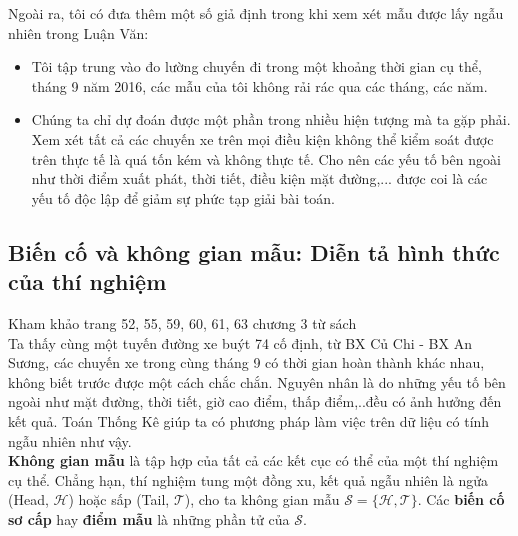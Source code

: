 \documentclass[a4paper, 13pt]{report}
\begin{document}
Ngoài ra, tôi có đưa thêm một số giả định trong khi xem xét mẫu được lấy ngẫu nhiên trong Luận Văn: 
\begin{itemize}
\item Tôi tập trung vào đo lường chuyến đi trong một khoảng thời gian cụ thể, tháng 9 năm 2016, các mẫu của tôi không rải rác qua các tháng, các năm. 
\item  Chúng ta chỉ dự đoán được một phần trong nhiều hiện tượng mà ta gặp phải. Xem xét tất cả các chuyến xe trên mọi điều kiện không thể kiểm soát được trên thực tế là quá tốn kém và không thực tế. Cho nên các yếu tố bên ngoài như thời điểm xuất phát, thời tiết, điều kiện mặt đường,... được coi là các yếu tố độc lập để giảm sự phức tạp giải bài toán.
\end{itemize}  
\subsection*{Biến cố và không gian mẫu: Diễn tả hình thức của thí nghiệm}
Kham khảo trang 52, 55, 59, 60, 61, 63 chương 3 từ sách \cite{TKCNUDR}\\
Ta thấy cùng một tuyến đường xe buýt 74 cố định, từ BX Củ Chi - BX An Sương, các chuyến xe trong cùng tháng 9 có thời gian hoàn thành khác nhau, không biết trước được một cách chắc chắn. Nguyên nhân là do những yếu tố bên ngoài như mặt đường, thời tiết, giờ cao điểm, thấp điểm,..đều có ảnh hưởng đến kết quả. Toán Thống Kê giúp ta có phương pháp làm việc trên dữ  liệu có tính ngẫu nhiên như vậy.\\
\textbf{Không gian mẫu} là tập hợp của tất cả các kết cục có thể của một thí nghiệm cụ thể. Chẳng hạn, thí nghiệm tung một đồng xu, kết quả ngẫu nhiên là ngửa (Head, $\mathcal{H}$) hoặc sấp (Tail, $\mathcal{T}$), cho ta không gian mẫu $\mathcal{S= \{H,T}\}$. Các \textbf{biến cố sơ cấp} hay \textbf{điểm mẫu} là những phần tử của $\mathcal{S}$.\\
\end{document}
